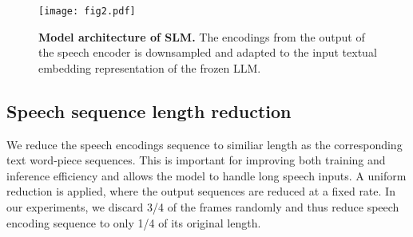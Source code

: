 \begin{figure}[h]
\centering
\texttt{[image: fig2.pdf]}
\caption{\textbf{Model architecture of SLM.} The encodings from the output of the speech encoder is downsampled and adapted to the input textual embedding representation of the frozen LLM.}
\label{fig:model_architecture}
    \vspace*{-.15in}
\end{figure}

\subsection{Speech sequence length reduction}
\label{sec:reduction}

We reduce the speech encodings sequence to similiar length as the corresponding text word-piece sequences. This is important for improving both training and inference efficiency and allows the model to handle long speech inputs. A uniform reduction is applied, where the output sequences are reduced at a fixed rate. In our experiments, we discard 3/4 of the frames randomly and thus reduce speech encoding sequence to only 1/4 of its original length.

